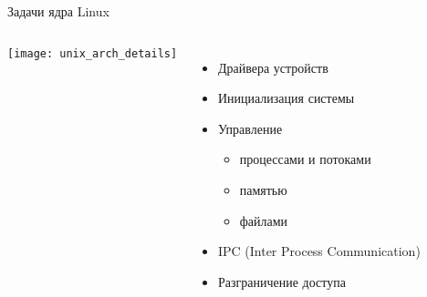 \begin{frame}[fragile]{Задачи ядра Linux}
    \begin{columns}
        \texttt{[image: unix\_arch\_details]}
	\begin{itemize}
		\item Драйвера устройств
		\item Инициализация системы
		\item Управление
                    \begin{itemize}
                        \item процессами и потоками
                        \item памятью
                        \item файлами
                    \end{itemize}
		\item IPC (Inter Process Communication)
		\item Разграничение доступа
	\end{itemize}
    \end{columns}
\end{frame}
